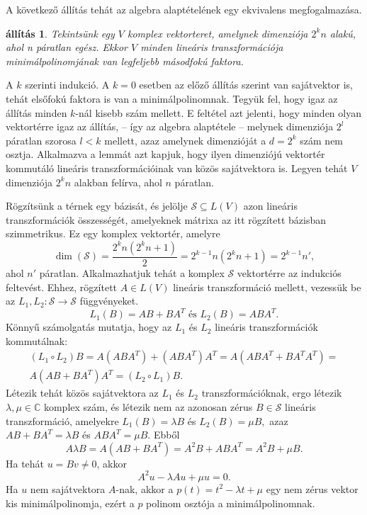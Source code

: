 \documentclass[a4paper, showtrims]{memoir}
\makeatletter
\renewenvironment{proof}[1][\proofname]
    {\par\pushQED{\qed}%
    \normalfont \topsep6\p@\@plus6\p@\relax
    \trivlist
    \item[\hskip\labelsep
        \itshape
    #1\@addpunct{:}]\ignorespaces}
    {\popQED\endtrivlist\@endpefalse}
\theoremstyle{plain}
\newtheorem{proposition}{állítás}[chapter]
\theoremstyle{remark}
\theoremstyle{definition}
\makeatother
\begin{document}
A következő állítás tehát az algebra alaptételének egy ekvivalens megfogalmazása.
\begin{proposition}
	Tekintsünk egy $V$ komplex vektorteret, amelynek dimenziója $2^kn$ alakú,
	ahol n páratlan egész.
	Ekkor $V$ minden lineáris transzformációja minimálpolinomjának
	van legfeljebb másodfokú faktora.
\end{proposition}
\begin{proof}
	A $k$ szerinti indukció.
	A $k=0$ esetben az előző állítás szerint van sajátvektor is,
	tehát elsőfokú faktora is van a minimálpolinomnak.
	Tegyük fel, hogy igaz az állítás minden $k$-nál kisebb szám mellett.
	E feltétel azt jelenti, hogy minden olyan vektortérre igaz az állítás,
	-- így az algebra alaptétele --
	melynek dimenziója $2^l$ páratlan szorosa $l<k$ mellett,
	azaz amelynek dimenzióját a $d=2^k$ szám nem osztja.
	Alkalmazva a lemmát azt kapjuk, hogy ilyen dimenziójú vektortér kommutáló
	lineáris transzformációinak van közös sajátvektora is.
	Legyen tehát $V$ dimenziója $2^kn$ alakban felírva, ahol $n$ páratlan.

	Rögzítsünk a térnek egy bázisát, és jelölje
	\(
	\mathcal{S}\subseteq L(V)
	\)
	azon lineáris transzformációk összességét,
	amelyeknek mátrixa az itt rögzített bázisban szimmetrikus.
	Ez egy komplex vektortér,
	amelyre
	\[
        \dim\left( \mathcal{S} \right)=
		\frac{2^kn\left( 2^kn+1 \right)}{2}=
		2^{k-1}n\left(2^kn+1  \right)=
		2^{k-1}n',
	\]
	ahol $n'$ páratlan.
	Alkalmazhatjuk tehát a komplex $\mathcal{S}$ vektortérre az indukciós feltevést.
	Ehhez, rögzített $A\in L\left( V \right)$ lineáris transzformáció mellett,
	vezessük be az $L_1,L_2:\mathcal{S}\to\mathcal{S}$ függvényeket.
	\[
		L_1\left( B \right)=AB+BA^T \text{ és }
		L_2\left( B \right)=ABA^T.
	\]
	Könnyű számolgatás mutatja, hogy az $L_1$ és $L_2$ lineáris transzformációk kommutálnak:
	\begin{multline*}
		\left( L_1\circ L_2\right)B=
		A\left( ABA^T \right)+\left( ABA^T \right)A^T=
		A\left( ABA^T+BA^TA^T \right)
		=\\
		A\left( AB+BA^T \right)A^T =
		\left( L_2\circ L_1 \right)B.
	\end{multline*}
	Létezik tehát közös sajátvektora az $L_1$ és $L_2$ transzformációknak, ergo
	létezik $\lambda,\mu\in\mathbb{C}$ komplex szám,
	és létezik nem az azonosan zérus $B\in\mathcal{S}$ lineáris transzformáció,
	amelyekre
	$
		L_1\left( B \right)=\lambda B
	$
	és
	$
		L_2\left( B \right)=\mu B,
	$
	azaz
	$
		AB+BA^T=\lambda B
	$
	és
	$
		ABA^T=\mu B.
	$
	Ebből
	\[
		A\lambda B=
		A\left( AB+BA^T \right)=
		A^2B + ABA^T=
		A^2B + \mu B.
	\]
	Ha tehát $u=Bv\neq 0$, akkor
	\[
		A^2u-\lambda Au+\mu u=0.
	\]
	Ha $u$ nem sajátvektora $A$-nak, akkor a
	$p\left( t \right)=t^2-\lambda t+\mu$
	egy nem zérus vektor kis minimálpolinomja,
	ezért a $p$ polinom osztója a minimálpolinomnak.
\end{proof}
\end{document}
